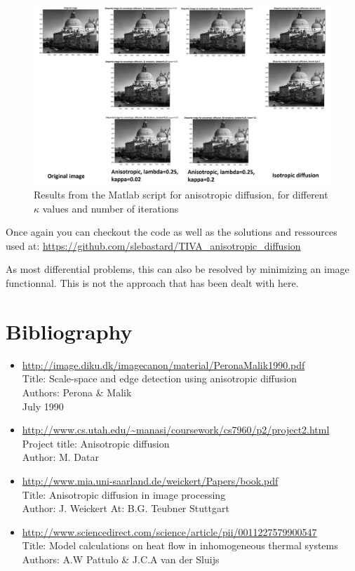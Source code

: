 \documentclass[12pt,a4paper]{article}
\begin{document}
\begin{figure}[h]
	\centering
	\includegraphics[scale=0.42]{anisotropic_diffusion.jpg}
	\caption{Results from the Matlab script for anisotropic diffusion, for different $\kappa$ values and number of iterations}	
\end{figure}

Once again you can checkout the code as well as the solutions and ressources used at: \url{https://github.com/slebastard/TIVA\_anisotropic\_diffusion}

As most differential problems, this can also be resolved by minimizing an image functionnal. This is not the approach that has been dealt with here.

\section{Bibliography}
\begin{itemize}
	\item \url{http://image.diku.dk/imagecanon/material/PeronaMalik1990.pdf}\\
	Title: Scale-space and edge detection using anisotropic diffusion\\
	Authors: Perona \& Malik\\
	July 1990
	\item \url{http://www.cs.utah.edu/~manasi/coursework/cs7960/p2/project2.html}\\
	Project title: Anisotropic diffusion\\
	Author: M. Datar
	\item \url{http://www.mia.uni-saarland.de/weickert/Papers/book.pdf}\\
	Title: Anisotropic diffusion in image processing\\
	Author: J. Weickert
	At: B.G. Teubner Stuttgart
	\item \url{http://www.sciencedirect.com/science/article/pii/0011227579900547}\\
	Title: Model calculations on heat flow in inhomogeneous thermal systems\\
	Authors: A.W Pattulo \& J.C.A van der Sluijs
\end{itemize}
\end{document}
